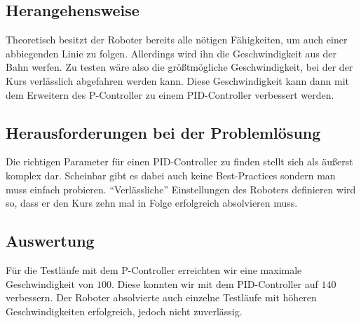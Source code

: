 \documentclass[ngerman]{tudscrreprt}
\begin{document}
\subsection{Herangehensweise}
Theoretisch besitzt der Roboter bereits alle nötigen Fähigkeiten, um auch einer abbiegenden Linie zu folgen. Allerdings wird ihn die Geschwindigkeit aus der Bahn werfen. Zu testen wäre also die größtmögliche Geschwindigkeit, bei der der Kurs verlässlich abgefahren werden kann. Diese Geschwindigkeit kann dann mit dem Erweitern des P-Controller zu einem PID-Controller verbessert werden.

\subsection{Herausforderungen bei der Problemlösung}
Die richtigen Parameter für einen PID-Controller zu finden stellt sich als äußerst komplex dar. Scheinbar gibt es dabei auch keine Best-Practices sondern man muss einfach probieren. \enquote{Verlässliche} Einstellungen des Roboters definieren wird so, dass er den Kurs zehn mal in Folge erfolgreich absolvieren muss.

\subsection{Auswertung}
Für die Testläufe mit dem P-Controller erreichten wir eine maximale Geschwindigkeit von $100$. Diese konnten wir mit dem PID-Controller auf $140$ verbessern. Der Roboter absolvierte auch einzelne Testläufe mit höheren Geschwindigkeiten erfolgreich, jedoch nicht zuverlässig.
\end{document}
